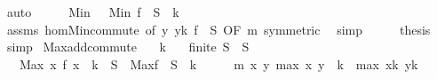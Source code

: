 \begin{isabellebody}
\ auto\isanewline
\ \ \isamarkupfalse%
\ \isamarkupfalse%
\ {\isachardoublequoteopen}Min\ {\isasymdots}\ {\isacharequal}{\kern0pt}\ Min\ {\isacharparenleft}{\kern0pt}f\ {\isacharbackquote}{\kern0pt}\ S{\isacharparenright}{\kern0pt}\ {\isacharplus}{\kern0pt}\ k{\isachardoublequoteclose}\isanewline
\ \ \ \ \isamarkupfalse%
\ assms\ hom{\isacharunderscore}{\kern0pt}Min{\isacharunderscore}{\kern0pt}commute\ {\isacharbrackleft}{\kern0pt}of\ {\isachardoublequoteopen}{\isasymlambda}y{\isachardot}{\kern0pt}\ y{\isacharplus}{\kern0pt}k{\isachardoublequoteclose}\ {\isachardoublequoteopen}f\ {\isacharbackquote}{\kern0pt}\ S{\isachardoublequoteclose}{\isacharcomma}{\kern0pt}\ OF\ m{\isacharcomma}{\kern0pt}\ symmetric{\isacharbrackright}{\kern0pt}\ \isamarkupfalse%
\ simp\isanewline
\ \ \isamarkupfalse%
\ \isamarkupfalse%
\ {\isacharquery}{\kern0pt}thesis\ \isamarkupfalse%
\ simp\isanewline
{}\isamarkupfalse%
%
\endisatagproof
{\isafoldproof}%
%
\isadelimproof
\isanewline
%
\endisadelimproof
\isanewline
{}\isamarkupfalse%
\ Max{\isacharunderscore}{\kern0pt}add{\isacharunderscore}{\kern0pt}commute{\isacharcolon}{\kern0pt}\isanewline
\ \ \ k\isanewline
\ \ \ {\isachardoublequoteopen}finite\ S{\isachardoublequoteclose}\ \ {\isachardoublequoteopen}S\ {\isasymnoteq}\ {\isacharbraceleft}{\kern0pt}{\isacharbraceright}{\kern0pt}{\isachardoublequoteclose}\isanewline
\ \ \ {\isachardoublequoteopen}Max\ {\isacharparenleft}{\kern0pt}{\isacharparenleft}{\kern0pt}{\isasymlambda}x{\isachardot}{\kern0pt}\ f\ x\ {\isacharplus}{\kern0pt}\ k{\isacharparenright}{\kern0pt}\ {\isacharbackquote}{\kern0pt}\ S{\isacharparenright}{\kern0pt}\ {\isacharequal}{\kern0pt}\ Max{\isacharparenleft}{\kern0pt}f\ {\isacharbackquote}{\kern0pt}\ S{\isacharparenright}{\kern0pt}\ {\isacharplus}{\kern0pt}\ k{\isachardoublequoteclose}\isanewline
%
\isadelimproof
%
\endisadelimproof
%
\isatagproof
{}\isamarkupfalse%
\ {\isacharminus}{\kern0pt}\isanewline
\ \ \isamarkupfalse%
\ m{\isacharcolon}{\kern0pt}\ {\isachardoublequoteopen}{\isasymAnd}x\ y{\isachardot}{\kern0pt}\ max\ x\ y\ {\isacharplus}{\kern0pt}\ k\ {\isacharequal}{\kern0pt}\ max\ {\isacharparenleft}{\kern0pt}x{\isacharplus}{\kern0pt}k{\isacharparenright}{\kern0pt}\ {\isacharparenleft}{\kern0pt}y{\isacharplus}{\kern0pt}k{\isacharparenright}{\kern0pt}{\isachardoublequoteclose}\isanewline
\ \ \ \ \isamarkupfalse%

\end{isabellebody}
